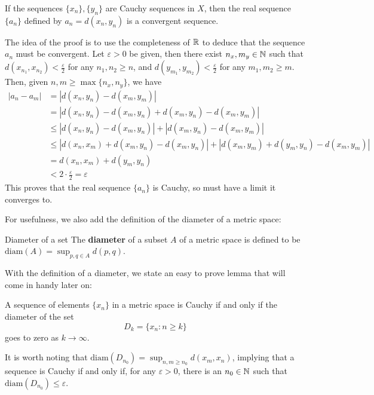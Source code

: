 \begin{bprop}{}{}
If the sequences $\{x_{n}\}, \{ y_{n} \}$ are Cauchy sequences in $X$, then the real sequence $\{a_{n}\}$ defined by $a_{n} = d(x_{n},y_{n})$ is a convergent sequence.
\end{bprop}
\begin{bproof}{}{}
The idea of the proof is to use the completeness of $\mathbb{R}$ to deduce that the sequence $a_{n}$ must be convergent. Let $\varepsilon > 0$ be given, then there exist $n_{x},m_{y} \in \mathbb{N}$ such that $d(x_{n_{1}},x_{n_{2}}) < \frac{\varepsilon}{2}$ for any $n_{1}, n_{2} \geq n$, and $d(y_{m_{1}},y_{m_{2}}) < \frac{\varepsilon}{2}$ for any $m_{1},m_{2} \geq m$. Then, given $n,m \geq \max\{ n_{x}, n_{y}\}$, we have
\begin{equation}
\begin{split}
    |a_{n} - a_{m}| &= |d(x_{n},y_{n}) - d(x_{m},y_{m})| \\
     &= |d(x_{n},y_{n}) - d(x_{m},y_{n}) + d(x_{m},y_{n})  - d(x_{m},y_{m})| \\
     &\leq |d(x_{n},y_{n}) - d(x_{m},y_{n})| + |d(x_{m},y_{n})  - d(x_{m},y_{m})| \\
     &\leq |d(x_{n},x_{m}) + d(x_{m},y_{n}) - d(x_{m},y_{n})| + |d(x_{m},y_{m}) + d(y_{m}, y_{n}) - d(x_{m},y_{m})| \\
     &= d(x_{n},x_{m}) + d(y_{m}, y_{n}) \\
     &< 2 \cdot \frac{\varepsilon}{2} = \varepsilon
\end{split}
\end{equation}
This proves that the real sequence $\{ a_{n} \}$ is Cauchy, so must have a limit it converges to.
\eop
\end{bproof}

For usefulness, we also add the definition of the diameter of a metric space:
\begin{bdefin}{Diameter of a set}{}
The \textbf{diameter} of a subset $A$ of a metric space is defined to be \mbox{$ \text{diam}(A) = \sup_{p,q \in A} d(p,q) $}.
\end{bdefin}

With the definition of a diameter, we state an easy to prove lemma that will come in handy later on:
\begin{blemma}{}{}
A sequence of elements $\{ x_{n} \}$ in a metric space is Cauchy if and only if the diameter of the set \[ D_{k} = \{x_{n} : n \geq k \} \] goes to zero as $k \to \infty$. 
\end{blemma}
It is worth noting that $\text{diam}(D_{n_{0}}) = \sup_{n,m \geq n_{0} } d(x_{m},x_{n})$, implying that a sequence is Cauchy if and only if, for any $\varepsilon > 0$, there is an $n_{0} \in \mathbb{N}$ such that $\text{diam}(D_{n_{0}}) \leq \varepsilon$. 

